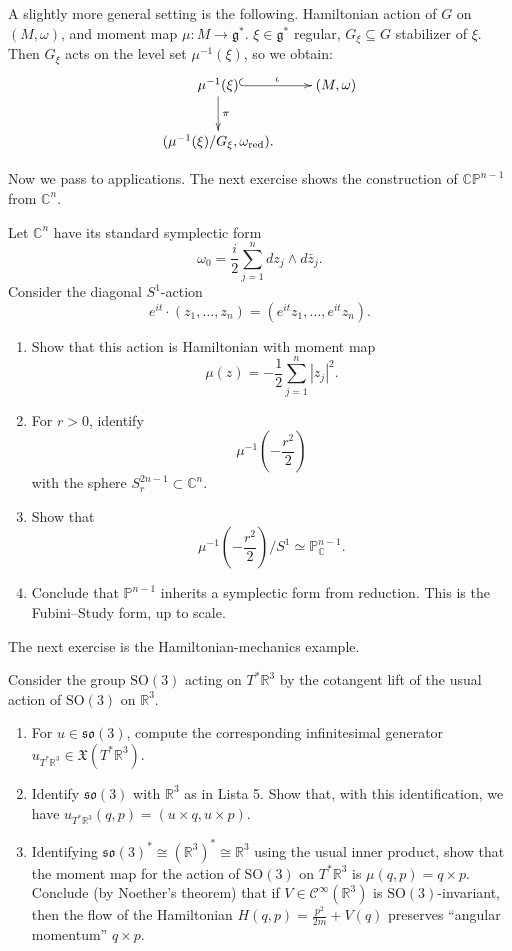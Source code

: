 \noindent
A slightly more general setting is the
following.
Hamiltonian action of $G$ on $(M,\omega)$,
and moment map
$\mu:M \to \mathfrak{g}^*$.
$\xi \in \mathfrak{g}^*$ regular, $G_\xi
\subseteq G$
stabilizer of $\xi$.
Then $G_\xi$ acts on the level set
$\mu^{-1}(\xi)$, so we obtain:
$$
\xymatrix{
\mu^{-1}(\xi)\ar[d]^{\pi}\ar@{^{(}->}[r]
^-{\iota}&
(M,\omega)\\
(\mu^{-1}(\xi)/G_\xi,\omega_{\text{red}
}).
}
$$



\medskip\noindent
Now we pass to applications.
The next exercise shows the
construction of $\mathbb{CP}^{n-1}$ from
$\mathbb{C}^n$.

\begin{exercise}
\label{exercise-projective-space-as-reduction}
Let $\mathbb{C}^n$ have its standard
symplectic form
$$
\omega_0=\frac{i}{2}\sum_{j=1}^n
dz_j\wedge d\bar z_j.
$$
Consider the diagonal $S^1$-action
$$
e^{it}\cdot(z_1,\dots,z_n)
=
(e^{it}z_1,\dots,e^{it}z_n).
$$
\begin{enumerate}
\item Show that this action is Hamiltonian
with moment map
$$
\mu(z)=
-\frac{1}{2}\sum_{j=1}^n |z_j|^2.
$$

\item For $r>0$, identify
$$
\mu^{-1}\left(-\frac{r^2}{2}\right)
$$
with the sphere $S^{2n-1}_r\subset
\mathbb{C}^n$.

\item Show that
$$
\mu^{-1}\left(-\frac{r^2}{2}\right)/S^1
\simeq \mathbb{P}^{n-1}_{\mathbb{C}}.
$$

\item Conclude that $\mathbb{P}^{n-1}$
inherits a symplectic form from reduction.
This is the Fubini--Study form, up to scale.
\end{enumerate}
\end{exercise}


\noindent
The next exercise is the 
Hamiltonian-mechanics example.

\begin{exercise}
\label{exercise-so3-action-cotangent}
Consider the group $\text{SO}(3)$ acting
on $T^*\mathbb{R}^{3}$ by the cotangent
lift of the usual action of
$\text{SO}(3)$ on $\mathbb{R}^{3}$.
\begin{enumerate}
\item For $u\in\mathfrak{so}(3)$, compute
the corresponding infinitesimal generator
$u_{T^*\mathbb{R}^3}\in\mathfrak{X}
(T^*\mathbb{R}^{3})$.
\item Identify $\mathfrak{so}(3)$ with
$\mathbb{R}^3$ as in Lista 5. Show that,
with this identification, we have
$u_{T^*\mathbb{R}^3}(q,p)
=(u\times q,u\times p)$.
\item Identifying $\mathfrak{so}(3)^*
\cong(\mathbb{R}^{3})^*
\cong\mathbb{R}^{3}$ using the usual
inner product, show that the moment map
for the action of $\text{SO}(3)$ on
$T^*\mathbb{R}^{3}$ is $\mu(q,p)=q\times
p$. Conclude (by Noether's theorem) that
if $V\in \mathcal{C}^\infty(\mathbb{R}^3)$
is $\text{SO}(3)$-invariant, then the
flow of the Hamiltonian $H(q,p)=\frac{p^2}
{2m}+V(q)$ preserves ``angular momentum''
$q \times p$.
\end{enumerate}
\end{exercise}

